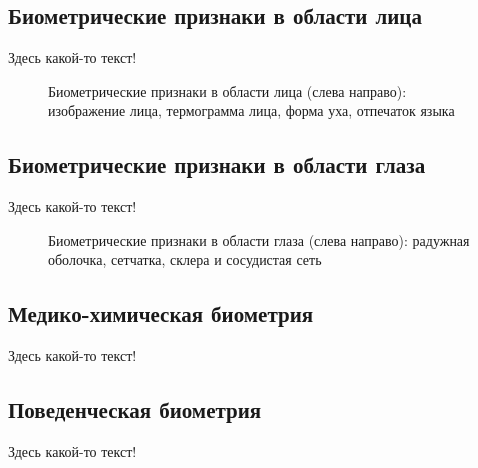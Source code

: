 \documentclass[12pt]{book}
\begin{document}
\subsection{Биометрические признаки в области лица}

\large{Здесь какой-то текст!}

\begin{figure}[h]
\caption{Биометрические признаки в области лица (слева направо): изображение лица, термограмма лица, форма уха, отпечаток языка}
\label{fig:figure_1_3}
\end{figure}

\subsection{Биометрические признаки в области глаза}

\large{Здесь какой-то текст!}

\begin{figure}[h]
\caption{Биометрические признаки в области глаза (слева направо): радужная оболочка, сетчатка, склера и сосудистая сеть}
\label{fig:figure_1_4}
\end{figure}

\subsection{Медико-химическая биометрия}

\large{Здесь какой-то текст!}

\subsection{Поведенческая биометрия}

\large{Здесь какой-то текст!}
\end{document}
